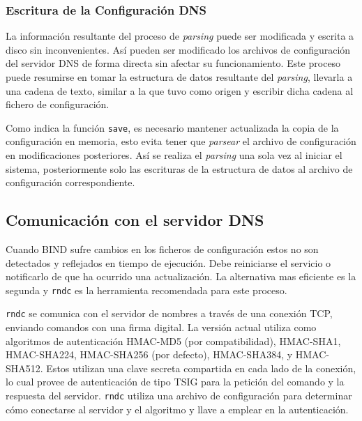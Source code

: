 \subsubsection{Escritura de la Configuración DNS}

La información resultante del proceso de \textit{parsing} puede ser modificada y escrita a disco sin inconvenientes. Así pueden ser modificado los archivos de configuración del servidor DNS de forma directa sin afectar su funcionamiento. Este proceso puede resumirse en tomar la estructura de datos resultante del \textit{parsing}, llevarla a una cadena de texto, similar a la que tuvo como origen y escribir dicha cadena al fichero de configuración.

Como indica la función \verb+save+, es necesario mantener actualizada la copia de la configuración en memoria, esto evita tener que \textit{parsear} el archivo de configuración en modificaciones posteriores. Así se realiza el \textit{parsing} una sola vez al iniciar el sistema, posteriormente solo las escrituras de la estructura de datos al archivo de configuración correspondiente.

\subsection{Comunicación con el servidor DNS}

Cuando BIND sufre cambios en los ficheros de configuración estos no son detectados y reflejados en tiempo de ejecución. Debe reiniciarse el servicio o notificarlo de que ha ocurrido una actualización. La alternativa mas eficiente es la segunda y \verb+rndc+ es la herramienta recomendada para este proceso.

\verb+rndc+ se comunica con el servidor de nombres a través de una conexión TCP, enviando comandos con una firma digital. La versión actual utiliza como algoritmos de autenticación HMAC-MD5 (por compatibilidad), HMAC-SHA1, HMAC-SHA224, HMAC-SHA256 (por defecto), HMAC-SHA384, y HMAC-SHA512. Estos utilizan una clave secreta compartida en cada lado de la conexión, lo cual provee de autenticación de tipo TSIG para la petición del comando y la respuesta del servidor. \verb+rndc+ utiliza una archivo de configuración para determinar cómo conectarse al servidor y el algoritmo y llave a emplear en la autenticación.
